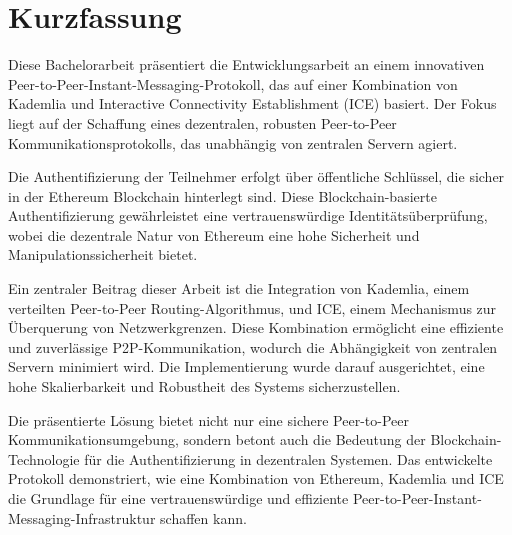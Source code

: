 \chapter*{Kurzfassung}



Diese Bachelorarbeit präsentiert die Entwicklungsarbeit an einem innovativen Peer-to-Peer-Instant-Messaging-Protokoll, das auf einer Kombination von Kademlia und Interactive Connectivity Establishment (ICE) basiert. Der Fokus liegt auf der Schaffung eines dezentralen, robusten Peer-to-Peer Kommunikationsprotokolls, das unabhängig von zentralen Servern agiert.

Die Authentifizierung der Teilnehmer erfolgt über öffentliche Schlüssel, die sicher in der Ethereum Blockchain hinterlegt sind. Diese Blockchain-basierte Authentifizierung gewährleistet eine vertrauenswürdige Identitätsüberprüfung, wobei die dezentrale Natur von Ethereum eine hohe Sicherheit und Manipulationssicherheit bietet.

Ein zentraler Beitrag dieser Arbeit ist die Integration von Kademlia, einem verteilten Peer-to-Peer Routing-Algorithmus, und ICE, einem Mechanismus zur Überquerung von Netzwerkgrenzen. Diese Kombination ermöglicht eine effiziente und zuverlässige P2P-Kommunikation, wodurch die Abhängigkeit von zentralen Servern minimiert wird. Die Implementierung wurde darauf ausgerichtet, eine hohe Skalierbarkeit und Robustheit des Systems sicherzustellen.

Die präsentierte Lösung bietet nicht nur eine sichere Peer-to-Peer Kommunikationsumgebung, sondern betont auch die Bedeutung der Blockchain-Technologie für die Authentifizierung in dezentralen Systemen. Das entwickelte Protokoll demonstriert, wie eine Kombination von Ethereum, Kademlia und ICE die Grundlage für eine vertrauenswürdige und effiziente Peer-to-Peer-Instant-Messaging-Infrastruktur schaffen kann.